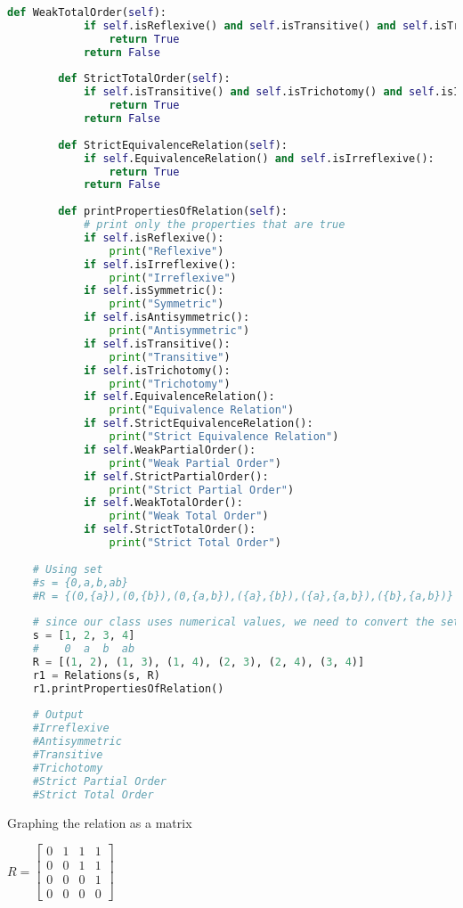 \begin{lstlisting}[language=Python]
        def WeakTotalOrder(self):
            if self.isReflexive() and self.isTransitive() and self.isTrichotomy():
                return True
            return False
    
        def StrictTotalOrder(self):
            if self.isTransitive() and self.isTrichotomy() and self.isIrreflexive():
                return True
            return False
    
        def StrictEquivalenceRelation(self):
            if self.EquivalenceRelation() and self.isIrreflexive():
                return True
            return False
    
        def printPropertiesOfRelation(self):
            # print only the properties that are true
            if self.isReflexive():
                print("Reflexive")
            if self.isIrreflexive():
                print("Irreflexive")
            if self.isSymmetric():
                print("Symmetric")
            if self.isAntisymmetric():
                print("Antisymmetric")
            if self.isTransitive():
                print("Transitive")
            if self.isTrichotomy():
                print("Trichotomy")
            if self.EquivalenceRelation():
                print("Equivalence Relation")
            if self.StrictEquivalenceRelation():
                print("Strict Equivalence Relation")
            if self.WeakPartialOrder():
                print("Weak Partial Order")
            if self.StrictPartialOrder():
                print("Strict Partial Order")
            if self.WeakTotalOrder():
                print("Weak Total Order")
            if self.StrictTotalOrder():
                print("Strict Total Order")
    
    # Using set
    #s = {0,a,b,ab}
    #R = {(0,{a}),(0,{b}),(0,{a,b}),({a},{b}),({a},{a,b}),({b},{a,b})}
    
    # since our class uses numerical values, we need to convert the set to a list of numbers and tuples of ordered pairs
    s = [1, 2, 3, 4]
    #    0  a  b  ab    
    R = [(1, 2), (1, 3), (1, 4), (2, 3), (2, 4), (3, 4)]
    r1 = Relations(s, R)
    r1.printPropertiesOfRelation()
    
    # Output
    #Irreflexive
    #Antisymmetric
    #Transitive
    #Trichotomy
    #Strict Partial Order
    #Strict Total Order    
\end{lstlisting}

Graphing the relation as a matrix

$R = \begin{bmatrix}
0 & 1 & 1 & 1 \\
0 & 0 & 1 & 1 \\
0 & 0 & 0 & 1 \\
0 & 0 & 0 & 0
\end{bmatrix}$ \\


